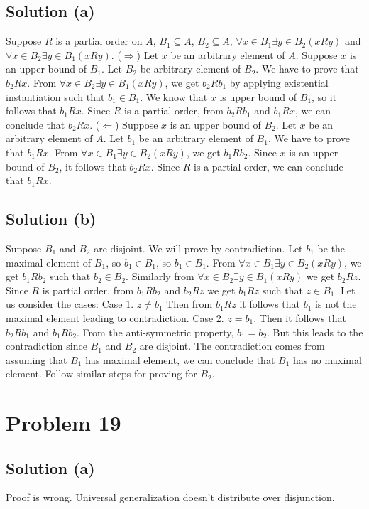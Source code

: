 \documentclass{article}
\begin{document}
\subsection{Solution (a)}
Suppose $R$ is a partial order on $A$, $B_1 \subseteq A$, $B_2
\subseteq A$, $\forall x \in B_1 \exists y \in B_2(xRy)$ and $\forall
x \in B_2 \exists y \in B_1 (xRy)$.
($\Rightarrow$) Let $x$ be an arbitrary element of $A$. Suppose $x$ is an
upper bound of $B_1$. Let $B_2$ be arbitrary element of $B_2$. We have
to prove that $b_2Rx$. From $\forall x \in B_2 \exists y \in B_1
(xRy)$, we get $b_2Rb_1$ by applying existential instantiation such
that $b_1 \in B_1$. We know that $x$ is upper bound of $B_1$, so it
follows that $b_1Rx$. Since $R$ is a partial order, from $b_2Rb_1$ and
$b_1Rx$, we can conclude that $b_2Rx$.
($\Leftarrow$) Suppose $x$ is an upper bound of $B_2$. Let $x$ be an
arbitrary element of $A$. Let $b_1$ be an arbitrary element of $B_1$.
We have to prove that $b_1Rx$. From $\forall x \in B_1 \exists y \in
B_2 (xRy)$, we get $b_1Rb_2$. Since $x$ is an upper bound of $B_2$, it
follows that $b_2Rx$. Since $R$ is a partial order, we can conclude
that $b_1Rx$.
\subsection{Solution (b)}
Suppose $B_1$ and $B_2$ are disjoint. We will prove by contradiction.
Let $b_1$ be the maximal element of $B_1$, so $b_1 \in B_1$, so $b_1
\in B_1$. From $\forall x \in B_1 \exists y \in B_2 (xRy)$, we get
$b_1Rb_2$ such that $b_2 \in B_2$. Similarly from $\forall x \in B_2
\exists y \in B_1(xRy)$ we get $b_2Rz$. Since $R$ is partial order,
from $b_1Rb_2$ and $b_2Rz$ we get $b_1Rz$ such that $z \in B_1$. Let
us consider the cases:
Case 1. $z \neq b_1$ Then from $b_1Rz$ it follows that $b_1$ is not
the maximal element leading to contradiction.
Case 2. $z = b_1$. Then it follows that $b_2Rb_1$ and $b_1Rb_2$. From
the anti-symmetric property, $b_1 = b_2$. But this leads to the
contradiction since $B_1$ and $B_2$ are disjoint.
The contradiction comes from assuming that $B_1$ has maximal element,
we can conclude that $B_1$ has no maximal element.
Follow similar steps for proving for $B_2$.

\section{Problem 19}
\subsection{Solution (a)}
Proof is wrong. Universal generalization doesn't distribute over
disjunction.
\end{document}
